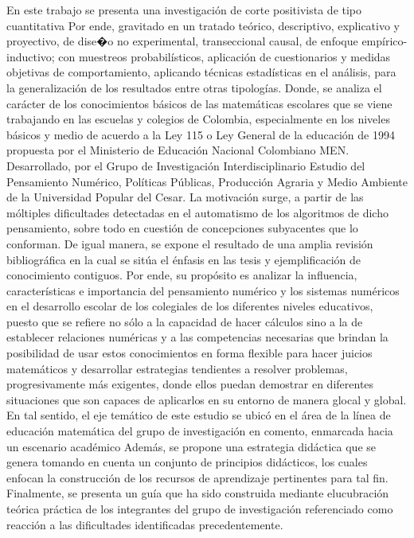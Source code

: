 \begin{titlepage}
\begin{minipage}{0.85\linewidth}
\begin{minipage}{0.85\linewidth}
\begin{resumen}
En este trabajo se presenta una investigaci\'{o}n de corte positivista de tipo cuantitativa Por ende, gravitado en un tratado te\'{o}rico, descriptivo, explicativo y proyectivo, de dise�o no experimental, transeccional causal, de enfoque emp\'{i}rico- inductivo; con muestreos probabil\'{i}sticos, aplicaci\'{o}n de cuestionarios y medidas objetivas de comportamiento, aplicando t\'{e}cnicas estad\'{i}sticas en el an\'{a}lisis, para la generalizaci\'{o}n de los resultados entre otras tipolog\'{i}as. Donde, se analiza el car\'{a}cter de los conocimientos b\'{a}sicos de las matem\'{a}ticas escolares que se viene trabajando en las escuelas y colegios de Colombia, especialmente en los niveles b\'{a}sicos y medio de acuerdo a la Ley 115 o Ley General de la educaci\'{o}n de 1994 propuesta por el Ministerio de Educaci\'{o}n Nacional Colombiano MEN. Desarrollado, por el Grupo de Investigaci\'{o}n Interdisciplinario Estudio del Pensamiento Num\'{e}rico, Pol\'{i}ticas P\'{u}blicas, Producci\'{o}n Agraria y Medio Ambiente de la Universidad Popular del Cesar. La motivaci\'{o}n surge, a partir de las m\'{o}ltiples dificultades detectadas en el automatismo de los algoritmos de dicho pensamiento, sobre todo en cuesti\'{o}n de concepciones subyacentes que lo conforman. De igual manera, se expone el resultado de una amplia revisi\'{o}n bibliogr\'{a}fica en la cual se sit\'{u}a el \'{e}nfasis en las tesis y ejemplificaci\'{o}n de conocimiento contiguos. Por ende, su prop\'{o}sito es analizar la influencia, caracter\'{i}sticas e importancia del pensamiento num\'{e}rico y los sistemas num\'{e}ricos en el desarrollo escolar de los colegiales de los diferentes niveles educativos, puesto que se refiere no s\'{o}lo a la capacidad de hacer c\'{a}lculos sino a la de establecer relaciones num\'{e}ricas y a las competencias necesarias que brindan la posibilidad de usar estos conocimientos en forma flexible para hacer juicios matem\'{a}ticos y desarrollar estrategias tendientes a resolver problemas, progresivamente m\'{a}s exigentes, donde ellos puedan demostrar en diferentes situaciones que son capaces de aplicarlos en su entorno de manera glocal y global. En tal sentido, el eje tem\'{a}tico de este estudio se ubic\'{o} en el \'{a}rea de la l\'{i}nea de educaci\'{o}n matem\'{a}tica del grupo de investigaci\'{o}n en comento, enmarcada hacia un escenario acad\'{e}mico Adem\'{a}s, se propone una estrategia did\'{a}ctica que se genera tomando en cuenta un conjunto de principios did\'{a}cticos, los cuales enfocan la construcci\'{o}n de los recursos de aprendizaje pertinentes para tal fin. Finalmente, se presenta un gu\'{i}a que ha sido construida mediante elucubraci\'{o}n te\'{o}rica pr\'{a}ctica de los integrantes del grupo de investigaci\'{o}n referenciado como reacci\'{o}n a las dificultades identificadas precedentemente.

\end{resumen}
\end{minipage}
\end{minipage}
\end{titlepage}
